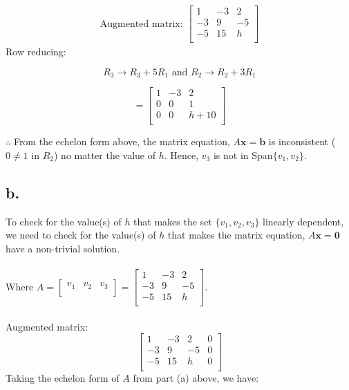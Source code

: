 \documentclass[12pt, a4paper]{article}
\begin{document}
\begin{align*}
\text{Augmented matrix: }
    \begin{bmatrix}
        1 & -3 & 2 \\
        -3 & 9 & -5 \\
        -5 & 15 & h \\
    \end{bmatrix}
\end{align*}
Row reducing:

\[
    R_3 \rightarrow R_3 + 5R_1 \text{ and } R_2 \rightarrow R_2 + 3R_1
\]

\[
    = \begin{bmatrix}
        1 & -3 & 2 \\
        0 & 0 & 1 \\
        0 & 0 & h + 10 \\
    \end{bmatrix}
\]

$\therefore$ From the echelon form above, the matrix equation, $A\boldsymbol{x} = \boldsymbol{b}$ is inconsistent ($0 \neq 1$ in $R_2$) no matter the value of $h$. Hence, $v_3$ is not in Span$\{v_1, v_2\}$.

\subsection*{b.}
To check for the value(s) of $h$ that makes the set $\{v_1, v_2, v_3\}$ linearly dependent, we need to check for the value(s) of $h$ that makes the matrix equation, $A\boldsymbol{x} = \boldsymbol{0}$ have a non-trivial solution. \\
\\
Where $A = \begin{bmatrix}
    v_1 & v_2 & v_3 \\
\end{bmatrix}
=\begin{bmatrix}
    1 & -3 & 2 \\
    -3 & 9 & -5 \\
    -5 & 15 & h \\
\end{bmatrix}$. \\
\\

Augmented matrix:
\[
    \begin{bmatrix}
        1 & -3 & 2 & 0 \\
        -3 & 9 & -5 & 0 \\
        -5 & 15 & h & 0 \\
    \end{bmatrix}
\]
Taking the echelon form of $A$ from part (a) above, we have:
\end{document}

